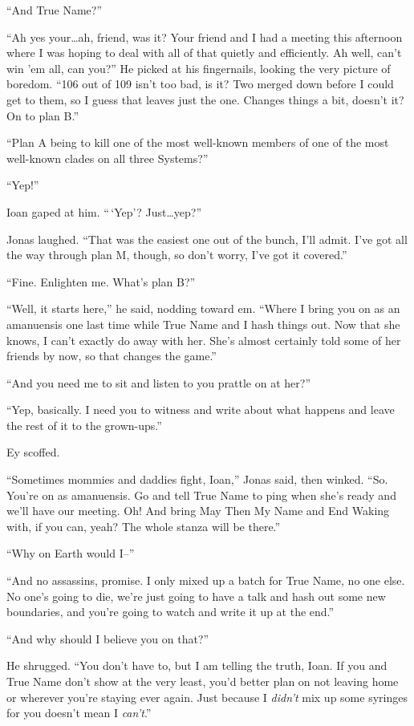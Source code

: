 ``And True Name?''

``Ah yes your\ldots ah, friend, was it? Your friend and I had a meeting this afternoon where I was hoping to deal with all of that quietly and efficiently. Ah well, can't win 'em all, can you?'' He picked at his fingernails, looking the very picture of boredom. ``106 out of 109 isn't too bad, is it? Two merged down before I could get to them, so I guess that leaves just the one. Changes things a bit, doesn't it? On to plan B.''

``Plan A being to kill one of the most well-known members of one of the most well-known clades on all three Systems?''

``Yep!''

Ioan gaped at him. ``\,`Yep'? Just\ldots yep?''

Jonas laughed. ``That was the easiest one out of the bunch, I'll admit. I've got all the way through plan M, though, so don't worry, I've got it covered.''

``Fine. Enlighten me. What's plan B?''

``Well, it starts here,'' he said, nodding toward em. ``Where I bring you on as an amanuensis one last time while True Name and I hash things out. Now that she knows, I can't exactly do away with her. She's almost certainly told some of her friends by now, so that changes the game.''

``And you need me to sit and listen to you prattle on at her?''

``Yep, basically. I need you to witness and write about what happens and leave the rest of it to the grown-ups.''

Ey scoffed.

``Sometimes mommies and daddies fight, Ioan,'' Jonas said, then winked. ``So. You're on as amanuensis. Go and tell True Name to ping when she's ready and we'll have our meeting. Oh! And bring May Then My Name and End Waking with, if you can, yeah? The whole stanza will be there.''

``Why on Earth would I--''

``And no assassins, promise. I only mixed up a batch for True Name, no one else. No one's going to die, we're just going to have a talk and hash out some new boundaries, and you're going to watch and write it up at the end.''

``And why should I believe you on that?''

He shrugged. ``You don't have to, but I am telling the truth, Ioan. If you and True Name don't show at the very least, you'd better plan on not leaving home or wherever you're staying ever again. Just because I \emph{didn't} mix up some syringes for you doesn't mean I \emph{can't}.''

